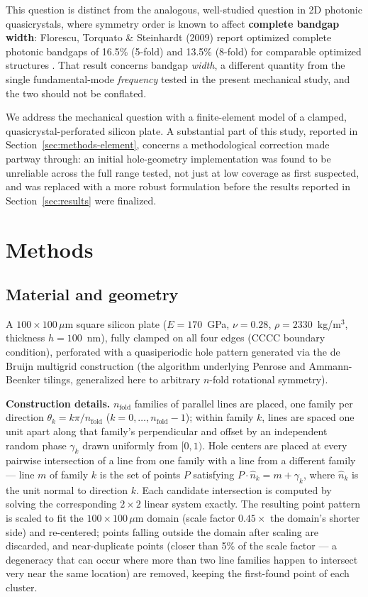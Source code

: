 \documentclass[11pt]{article}
\begin{document}
This question is distinct from the analogous, well-studied question in 2D photonic quasicrystals, where symmetry order is known to affect \textbf{complete bandgap width}: Florescu, Torquato \& Steinhardt (2009) report optimized complete photonic bandgaps of 16.5\% (5-fold) and 13.5\% (8-fold) for comparable optimized structures \cite{florescu2009}. That result concerns bandgap \textit{width}, a different quantity from the single fundamental-mode \textit{frequency} tested in the present mechanical study, and the two should not be conflated.

We address the mechanical question with a finite-element model of a clamped, quasicrystal-perforated silicon plate. A substantial part of this study, reported in Section~\ref{sec:methods-element}, concerns a methodological correction made partway through: an initial hole-geometry implementation was found to be unreliable across the full range tested, not just at low coverage as first suspected, and was replaced with a more robust formulation before the results reported in Section~\ref{sec:results} were finalized.

\section{Methods}

\subsection{Material and geometry}

A $100\times100\,\mu$m square silicon plate ($E = 170$~GPa, $\nu = 0.28$, $\rho = 2330$~kg/m$^3$, thickness $h = 100$~nm), fully clamped on all four edges (CCCC boundary condition), perforated with a quasiperiodic hole pattern generated via the de Bruijn multigrid construction (the algorithm underlying Penrose and Ammann-Beenker tilings, generalized here to arbitrary $n$-fold rotational symmetry).

\textbf{Construction details.} $n_{\text{fold}}$ families of parallel lines are placed, one family per direction $\theta_k = k\pi/n_{\text{fold}}$ ($k = 0,\ldots,n_{\text{fold}}-1$); within family $k$, lines are spaced one unit apart along that family's perpendicular and offset by an independent random phase $\gamma_k$ drawn uniformly from $[0,1)$. Hole centers are placed at every pairwise intersection of a line from one family with a line from a different family --- line $m$ of family $k$ is the set of points $P$ satisfying $P\cdot\hat{n}_k = m + \gamma_k$, where $\hat{n}_k$ is the unit normal to direction $k$. Each candidate intersection is computed by solving the corresponding $2\times2$ linear system exactly. The resulting point pattern is scaled to fit the $100\times100\,\mu$m domain (scale factor $0.45\times$ the domain's shorter side) and re-centered; points falling outside the domain after scaling are discarded, and near-duplicate points (closer than 5\% of the scale factor --- a degeneracy that can occur where more than two line families happen to intersect very near the same location) are removed, keeping the first-found point of each cluster.
\end{document}
